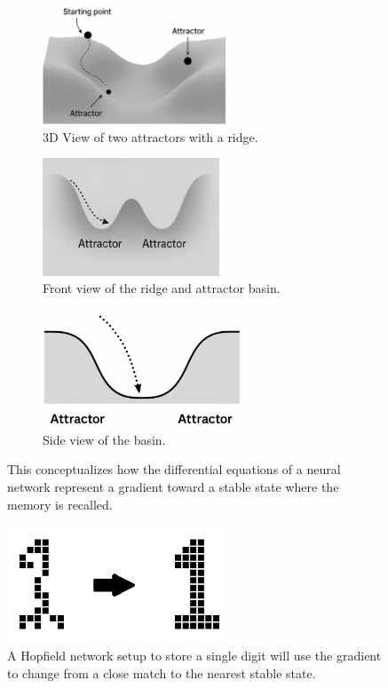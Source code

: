 \documentclass{book}       %
\begin{document}
\begin{figure}[h]
  \centering
  \begin{subfigure}[b]{0.32\linewidth}
  \includegraphics[height=3.5cm]{images/hopfield_attractor3.png}
    \caption{3D View of two attractors with a ridge.}
  \end{subfigure}
  \hfill
  \begin{subfigure}[b]{0.32\linewidth}
  \includegraphics[height=3.5cm]{images/hopfield_attractor.png}
    \caption{Front view of the ridge and attractor basin.}
  \end{subfigure}
  \hfill
  \begin{subfigure}[b]{0.32\linewidth}
  \includegraphics[height=3.5cm]{images/hopfield_attractor2.png}
    \caption{Side view of the basin.}
  \end{subfigure}
  \caption{This conceptualizes how the differential equations of a neural network represent a gradient toward a stable state where the memory is recalled.}
\end{figure}

\begin{figure}[h]
  \centering
  \includegraphics[height=3.5cm]{images/hopfield_bitmap.png}
  \caption{A Hopfield network setup to store a single digit will use the gradient to change from a close match to the nearest stable state.}
\end{figure}
\end{document}
